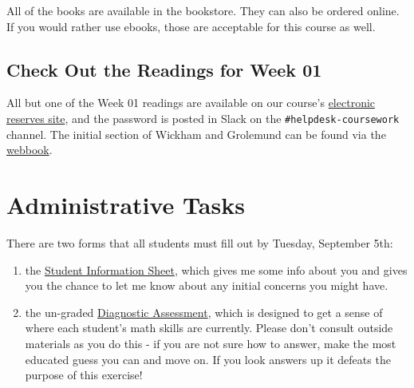 \documentclass[]{book}
\theoremstyle{definition}
\theoremstyle{definition}
\theoremstyle{definition}
\theoremstyle{remark}
\begin{document}
All of the books are available in the bookstore. They can also be
ordered online. If you would rather use ebooks, those are acceptable for
this course as well.

\subsection{Check Out the Readings for Week
01}\label{check-out-the-readings-for-week-01}

All but one of the Week 01 readings are available on our course's
\href{http://eres.slu.edu/eres/coursepass.aspx?cid=4487}{electronic
reserves site}, and the password is posted in Slack on the
\texttt{\#helpdesk-coursework} channel. The initial section of Wickham
and Grolemund can be found via the
\href{http://r4ds.had.co.nz}{webbook}.

\section{Administrative Tasks}\label{administrative-tasks}

There are two forms that all students must fill out by Tuesday,
September 5th:

\begin{enumerate}
\def\labelenumi{\arabic{enumi}.}
\item
  the \href{https://goo.gl/forms/HddqLWd00qz6Qs903}{Student Information
  Sheet}, which gives me some info about you and gives you the chance to
  let me know about any initial concerns you might have.
\item
  the un-graded \href{https://goo.gl/forms/EgVGaUWu8mys2yBr2}{Diagnostic
  Assessment}, which is designed to get a sense of where each student's
  math skills are currently. Please don't consult outside materials as
  you do this - if you are not sure how to answer, make the most
  educated guess you can and move on. If you look answers up it defeats
  the purpose of this exercise!
\end{enumerate}


\end{document}
